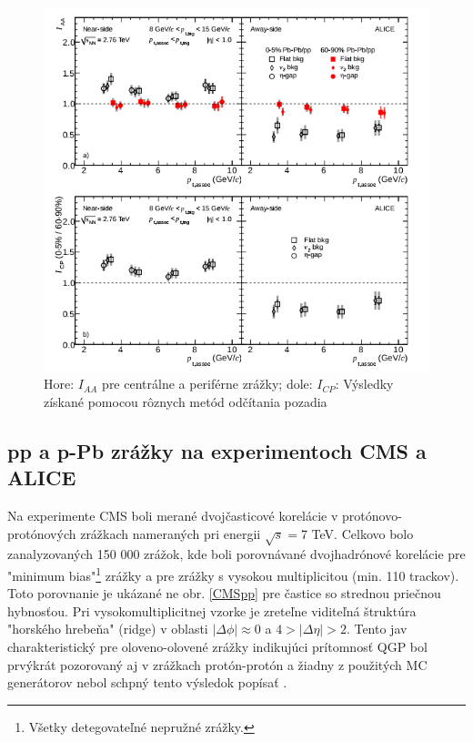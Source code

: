 \documentclass[thesismargins, thesislinespacing]{rnthesis}
\begin{document}
\begin{figure}[hbtp!]
	\centering
	\includegraphics[scale=0.8]{./Obrazky_praca/clanok2.png}
	\caption{ Hore: $I_{AA}$ pre centrálne a periférne zrážky; dole: $I_{CP}$: Výsledky získané pomocou rôznych metód odčítania pozadia~\cite{clanok}}
	\label{clanok2}
\end{figure}

\subsection{pp a p-Pb zrážky na experimentoch CMS a ALICE}
\label{textAliceCms}
Na experimente CMS boli merané dvojčasticové korelácie v protónovo-protónových zrážkach nameraných pri energii $\sqrt{s}=$7 TeV. Celkovo bolo zanalyzovaných 150 000 zrážok, kde boli porovnávané dvojhadrónové korelácie pre "minimum bias"\footnote{Všetky detegovateľné nepružné zrážky.} zrážky a pre zrážky s vysokou multiplicitou (min. 110 trackov). Toto porovnanie je ukázané ne obr. \ref{CMSpp} pre častice so strednou priečnou hybnosťou. Pri vysokomultiplicitnej vzorke je zreteľne viditeľná štruktúra "horského hrebeňa" (ridge) v oblasti $|\Delta \phi|\approx0$ a $4>|\Delta \eta|>2$. Tento jav charakteristický pre oloveno-olovené zrážky indikujúci prítomnosť QGP bol prvýkrát pozorovaný aj v zrážkach protón-protón a žiadny z použitých MC generátorov nebol schpný tento výsledok popísať \cite{CMSpp}. 
\end{document}
